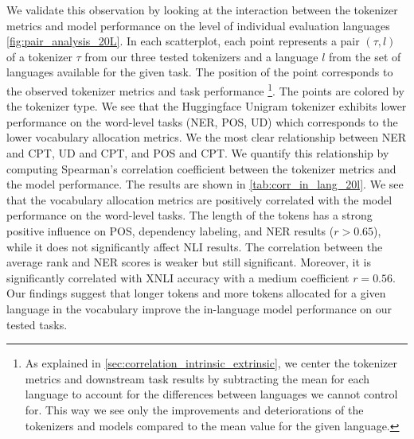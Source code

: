 We validate this observation by looking at the interaction between the tokenizer metrics and model performance on the level of individual evaluation languages \autoref{fig:pair_analysis_20L}. In each scatterplot, each point represents a pair $(\tau, l)$ of a tokenizer $\tau$ from our three tested tokenizers and a language $l$ from the set of languages available for the given task. The position of the point corresponds to the observed tokenizer metrics and task performance \footnote{As explained in \autoref{sec:correlation_intrinsic_extrinsic}, we center the tokenizer metrics and downstream task results by subtracting the mean for each language to account for the differences between languages we cannot control for. This way we see only the improvements and deteriorations of the tokenizers and models compared to the mean value for the given language.}.
 The points are colored by the tokenizer type.
  We see that the Huggingface Unigram tokenizer exhibits lower performance on the word-level tasks (NER, POS, UD) which corresponds to the lower vocabulary allocation metrics. We the most clear relationship between NER and CPT, UD and CPT, and POS and CPT. We quantify this relationship by computing Spearman's correlation coefficient between the tokenizer metrics and the model performance. The results are shown in \autoref{tab:corr_in_lang_20l}. We see that the vocabulary allocation metrics are positively correlated with the model performance on the word-level tasks. The length of the tokens has a strong positive influence on POS, dependency labeling, and NER results ($r > 0.65$), while it does not significantly affect NLI results. The correlation between the average rank and NER scores is weaker but still significant. Moreover, it is significantly correlated with XNLI accuracy with a medium coefficient $r = 0.56$. Our findings suggest that longer tokens and more tokens allocated for a given language in the vocabulary improve the in-language model performance on our tested tasks. 

